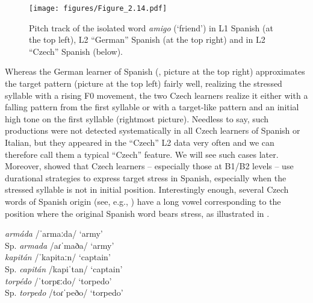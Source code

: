 \begin{figure}




\texttt{[image: figures/Figure\_2.14.pdf]}



\caption{Pitch track of the isolated word \textit{amigo} (‘friend’) in L1 Spanish (at the top left), L2 “German” Spanish (at the top right) and in L2 “Czech” Spanish (below).}
\label{fig:2.14}
\end{figure}

Whereas the German learner of Spanish (, picture at the top right) approximates the target pattern (picture at the top left) fairly well, realizing the stressed syllable with a rising F0 movement, the two Czech learners realize it either with a falling pattern from the first syllable or with a target-like pattern and an initial high tone on the first syllable (rightmost picture). Needless to say, such productions were not detected systematically in all Czech learners of Spanish or Italian, but they appeared in the “Czech” L2 data very often and we can therefore call them a typical “Czech” feature. We will see such cases later. Moreover, \citet{PeškováEtAl2017} showed that Czech learners -- especially those at B1/B2 levels -- use durational strategies to express target stress in Spanish, especially when the stressed syllable is not in initial position. Interestingly enough, several Czech words of Spanish origin (see, e.g., \citealt{Ježková2000}) have a long vowel corresponding to the position where the original Spanish word bears stress, as illustrated in .


\ea\label{ex:2:1}
\ea {}   \textit{armáda}   {\normalfont /ˈarmaːda/} \normalfont‘army’\\
Sp.   \textit{armada}   /aɾˈmaða/   ‘army’\\


\ex {}   \textit{kapitán}   \normalfont/ˈkapitaːn/  \normalfont‘captain’\\
Sp.   \textit{capitán}   /kapiˈtan/   ‘captain’\\


\ex  {}   \textit{torpédo}   \normalfont/ˈtorpɛːdo/  \normalfont‘torpedo’\\
Sp.   \textit{torpedo}   /toɾˈpeðo/   ‘torpedo’\\


